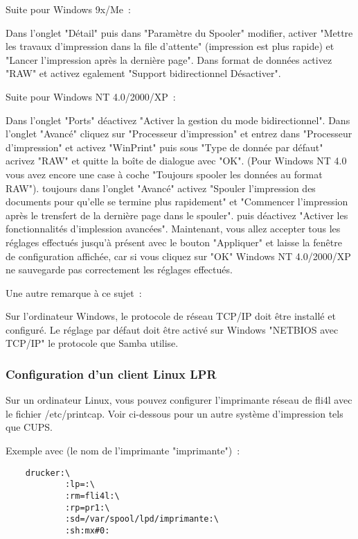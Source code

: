 \begin{enumerate}
    Suite pour Windows 9x/Me~:

     Dans l'onglet "Détail" puis dans "Paramètre du Spooler" modifier, activer
     "Mettre les travaux d'impression dans la file d'attente" (impression est
     plus rapide) et "Lancer l'impression après la dernière page". Dans format
     de données activez "RAW" et activez egalement "Support bidirectionnel
     Désactiver".

    Suite pour Windows NT 4.0/2000/XP~:

    Dans l'onglet "Ports" déactivez "Activer la gestion du mode bidirectionnel".
    Dans l'onglet "Avancé" cliquez sur "Processeur d'impression" et entrez dans
    "Processeur d'impression" et activez "WinPrint" puis sous "Type de donnée par
    défaut" acrivez "RAW" et quitte la boîte de dialogue avec "OK". (Pour Windows
    NT 4.0 vous avez encore une case à coche "Toujours spooler les données au
    format RAW"). toujours dans l'onglet "Avancé" activez "Spouler l'impression
    des documents pour qu'elle se termine plus rapidement" et "Commencer l'impression
    après le trensfert de la dernière page dans le spouler". puis déactivez "Activer
    les fonctionnalités d'implession avancées". Maintenant, vous allez accepter
    tous les réglages effectués jusqu'à présent avec le bouton "Appliquer" et
    laisse la fenêtre de configuration affichée, car si vous cliquez sur "OK"
    Windows NT 4.0/2000/XP ne sauvegarde pas correctement les réglages effectués.

    Une autre remarque à ce sujet~:

    Sur l'ordinateur Windows, le protocole de réseau TCP/IP doit être installé
    et configuré. Le réglage par défaut doit être activé sur Windows "NETBIOS avec
    TCP/IP"  le protocole que Samba utilise.

\end{enumerate}


\subsubsection{Configuration d'un client Linux LPR}

    Sur un ordinateur Linux, vous pouvez configurer l'imprimante réseau de fli4l
    avec le fichier /etc/printcap. Voir ci-dessous pour un autre système
	d'impression tels que CUPS.

    Exemple avec (le nom de l'imprimante "imprimante")~:

\begin{example}
\begin{verbatim}
    drucker:\
            :lp=:\
            :rm=fli4l:\
            :rp=pr1:\
            :sd=/var/spool/lpd/imprimante:\
            :sh:mx#0:
\end{verbatim}
\end{example}

